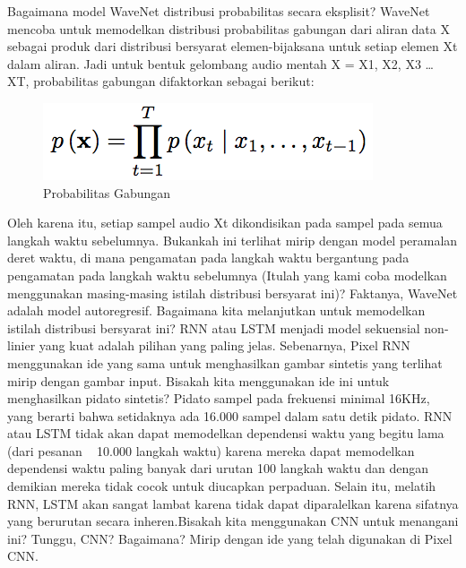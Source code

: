 Bagaimana model WaveNet distribusi probabilitas secara eksplisit? WaveNet mencoba untuk memodelkan distribusi probabilitas gabungan dari aliran data X sebagai produk dari distribusi bersyarat elemen-bijaksana untuk setiap elemen Xt dalam aliran. Jadi untuk bentuk gelombang audio mentah X = {X1, X2, X3 … XT}, probabilitas gabungan difaktorkan sebagai berikut:
\begin{figure}[H]
        \centerline{\includegraphics[scale=.5]{figures/rumus3}}
        \caption{Probabilitas Gabungan}
		\label{rumus3}
\end{figure}
Oleh karena itu, setiap sampel audio Xt dikondisikan pada sampel pada semua langkah waktu sebelumnya. Bukankah ini terlihat mirip dengan model peramalan deret waktu, di mana pengamatan pada langkah waktu bergantung pada pengamatan pada langkah waktu sebelumnya (Itulah yang kami coba modelkan menggunakan masing-masing istilah distribusi bersyarat ini)? Faktanya, WaveNet adalah model autoregresif.
Bagaimana kita melanjutkan untuk memodelkan istilah distribusi bersyarat ini? RNN atau LSTM menjadi model sekuensial non-linier yang kuat adalah pilihan yang paling jelas. Sebenarnya, Pixel RNN menggunakan ide yang sama untuk menghasilkan gambar sintetis yang terlihat mirip dengan gambar input. Bisakah kita menggunakan ide ini untuk menghasilkan pidato sintetis? Pidato sampel pada frekuensi minimal 16KHz, yang berarti bahwa setidaknya ada 16.000 sampel dalam satu detik pidato. RNN atau LSTM tidak akan dapat memodelkan dependensi waktu yang begitu lama (dari pesanan ~ 10.000 langkah waktu) karena mereka dapat memodelkan dependensi waktu paling banyak dari urutan 100 langkah waktu dan dengan demikian mereka tidak cocok untuk diucapkan perpaduan. Selain itu, melatih RNN, LSTM akan sangat lambat karena tidak dapat diparalelkan karena sifatnya yang berurutan secara inheren.Bisakah kita menggunakan CNN untuk menangani ini? Tunggu, CNN? Bagaimana? Mirip dengan ide yang telah digunakan di Pixel CNN.

